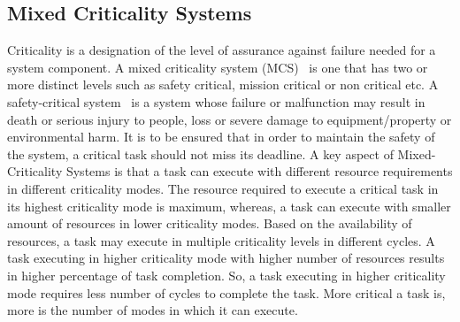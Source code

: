 \subsection{Mixed Criticality Systems}\label{mcs}
\noindent
Criticality is a designation of the level of assurance against failure needed for a system component. A mixed criticality 
system (MCS)~\cite{wiki:xxx4} is one that has two or more distinct levels such as safety critical, mission critical or 
non critical etc. 
A safety-critical system~\cite{wiki:xxx8} is a system whose failure or malfunction may result in death or serious injury to 
people, loss or severe damage to equipment/property or environmental harm. It is to be ensured that in order to maintain the 
safety of the system, a critical task should not miss its deadline. 
\newline
\newline
A key aspect of Mixed-Criticality Systems is that a task can execute with different resource requirements in different 
criticality modes. The resource required to execute a critical task in its highest criticality mode is maximum, whereas,
a task can execute with smaller amount of resources in lower criticality modes. Based on the availability of resources, 
a task may execute in multiple criticality levels in different cycles. A task executing in higher criticality mode with 
higher number of resources results in higher percentage of task completion. So, a task executing in higher criticality mode 
requires less number of cycles to complete the task. More critical a task is, more is the number of modes in which it can 
execute.
% 

